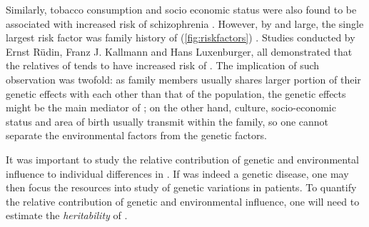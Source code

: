 	Similarly, tobacco consumption \citep{Kelly1999} and socio economic status were also found to be associated with increased risk of schizophrenia \citep{McGrath2008a}.
	However, by and large, the single largest risk factor was family history of  (\cref{fig:riskfactors}) \citep{Sullivan2005}.
	Studies conducted by Ernst R{\"u}din, Franz J. Kallmann and Hans Luxenburger, all demonstrated that the relatives of  tends to have increased risk of  \citep{Gottesman1982}. 
	The implication of such observation was twofold:
	as family members usually shares larger portion of their genetic effects with each other than that of the population, the genetic effects might be the main mediator of ; 
	on the other hand, culture, socio-economic status and area of birth usually transmit within the family, so one cannot separate the environmental factors from the genetic factors.

	It was important to study the relative contribution of genetic and environmental influence to individual differences in .
	If  was indeed a genetic disease, one may then focus the resources into study of genetic variations in  patients. 
	To quantify the relative contribution of genetic and environmental influence, one will need to estimate the \emph{heritability} of .
	